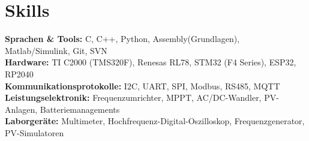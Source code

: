 \documentclass[letterpaper,11pt]{article}
\begin{document}
\vspace{-3pt}
\section{Skills}
\vspace{2pt}

  \textbf{Sprachen \& Tools:} {C, C++, Python, Assembly(Grundlagen), Matlab/Simulink, Git, SVN} \\ \vspace{2pt}
  \textbf{Hardware:} {TI C2000 (TMS320F), Renesas RL78, STM32 (F4 Series), ESP32, RP2040} \\ \vspace{2pt}
  \textbf{Kommunikationsprotokolle:} {I2C, UART, SPI, Modbus, RS485, MQTT} \\ \vspace{2pt}
  \textbf{Leistungselektronik:} {Frequenzumrichter, MPPT, AC/DC-Wandler, PV-Anlagen, Batteriemanagements} \\ \vspace{2pt} 
  \textbf{Laborgeräte:} {Multimeter, Hochfrequenz-Digital-Oszilloskop, Frequenzgenerator, PV-Simulatoren} \\ \vspace{2pt}

\vspace{-8pt}
\end{document}

